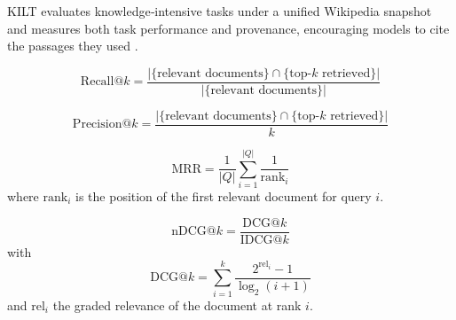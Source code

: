 KILT evaluates knowledge‑intensive tasks under a unified Wikipedia snapshot and measures both task performance and provenance, encouraging models to cite the passages they used \citep{petroni2021kilt}.


\begin{equation}
\mathrm{Recall@}k = \frac{| \{ \text{relevant documents} \} \cap \{ \text{top-}k \text{ retrieved} \} |}{| \{ \text{relevant documents} \} |}
\label{eq:recallk}
\end{equation}

\begin{equation}
\mathrm{Precision@}k = \frac{| \{ \text{relevant documents} \} \cap \{ \text{top-}k \text{ retrieved} \} |}{k}
\label{eq:precisionk}
\end{equation}

\begin{equation}
\mathrm{MRR} = \frac{1}{|Q|} \sum_{i=1}^{|Q|} \frac{1}{\mathrm{rank}_i}
\label{eq:MRR}
\end{equation}
where $\mathrm{rank}_i$ is the position of the first relevant document for query $i$.

\begin{equation}
\mathrm{nDCG@}k = \frac{\mathrm{DCG@}k}{\mathrm{IDCG@}k}
\label{eq:nDCG}
\end{equation}
with
\[
\mathrm{DCG@}k = \sum_{i=1}^k \frac{2^{\mathrm{rel}_i} - 1}{\log_2(i+1)}
\]
and $\mathrm{rel}_i$ the graded relevance of the document at rank $i$.


